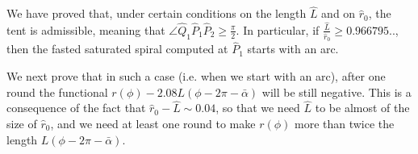 \documentclass[reqno]{amsart}
\theoremstyle{definition} \newtheorem{definition}{Definition}[section]
\theoremstyle{definition} \newtheorem{remark}[definition]{Remark}
\theoremstyle{plain} \newtheorem{lemma}[definition]{Lemma}
\theoremstyle{plain} \newtheorem{proposition}[definition]{Proposition}
\theoremstyle{plain} \newtheorem{theorem}[definition]{Theorem}
\theoremstyle{plain} \newtheorem{corollary}[definition]{Corollary}
\theoremstyle{definition} \newtheorem{example}[definition]{Example}
\theoremstyle{plain} \newtheorem{claim}[clai]{Claim}
\theoremstyle{definition} \newtheorem{assumption}[definition]{Assumption}
\theoremstyle{definition} \newtheorem{observation}[definition]{Observation}
\newcommand{\1}{\mathbbm 1}
\numberwithin{equation}{section} %
\theoremstyle{plain} \newtheorem*{theorem*}{Theorem}
\theoremstyle{plain} \newtheorem{mthm}[maintheorem]{Main Theorem}
\theoremstyle{plain} \newtheorem*{mthm*}{Main Theorem}
\theoremstyle{plain} \newtheorem*{conjecture*}{Conjecture}
\theoremstyle{plain} \newtheorem{conjecture}[definition]{Conjecture}
\theoremstyle{plain} \newtheorem*{problem*}{Problem}
\begin{document}

We have proved that, under certain conditions on the length $\hat L$ and on $\hat r_0$, the tent is admissible, meaning that $\angle\hat Q_1\hat P_1\hat P_2\geq\frac{\pi}{2}$. In particular, if $\frac{\hat L}{\hat r_0}\geq 0.966795..$, then the fasted saturated spiral computed at $\hat P_1$ starts with an arc.

We next prove that in such a case (i.e. when we start with an arc), after one round the functional $r(\phi) - 2.08 L(\phi - 2\pi - \bar \alpha)$ will be still negative. This is a consequence of the fact that $\hat r_0 - \hat L \sim 0.04$, so that we need $\hat L$ to be almost of the size of $\hat r_0$, and we need at least one round to make $r(\phi)$ more than twice the length $L(\phi - 2\pi - \bar \alpha)$.
\end{document}
